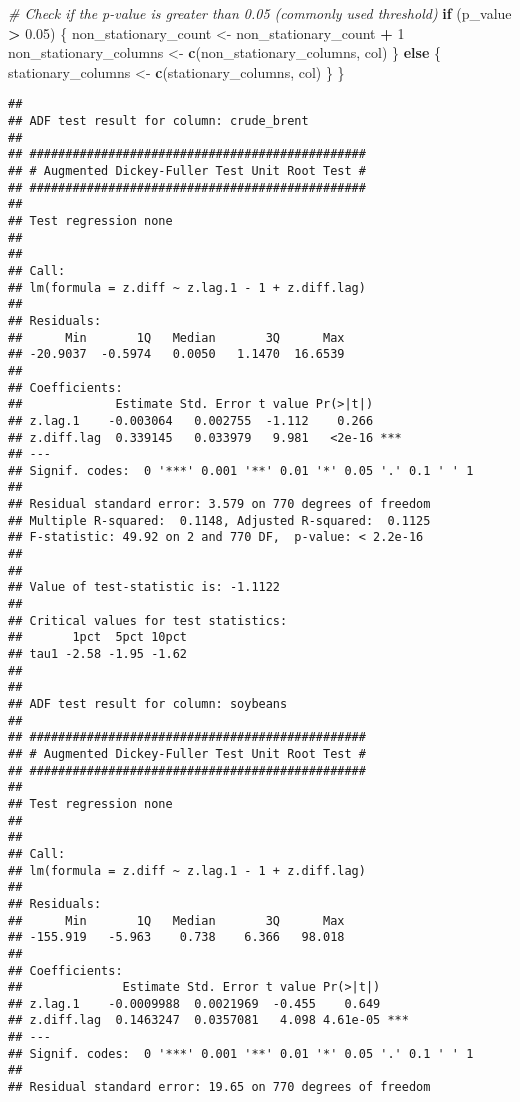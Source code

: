 \documentclass[
]{article}
\newenvironment{Shaded}{\begin{snugshade}}{\end{snugshade}}
\newcommand{\CommentTok}[1]{\textcolor[rgb]{0.56,0.35,0.01}{\textit{#1}}}
\newcommand{\ControlFlowTok}[1]{\textcolor[rgb]{0.13,0.29,0.53}{\textbf{#1}}}
\newcommand{\DecValTok}[1]{\textcolor[rgb]{0.00,0.00,0.81}{#1}}
\newcommand{\FloatTok}[1]{\textcolor[rgb]{0.00,0.00,0.81}{#1}}
\newcommand{\FunctionTok}[1]{\textcolor[rgb]{0.13,0.29,0.53}{\textbf{#1}}}
\newcommand{\NormalTok}[1]{#1}
\newcommand{\OtherTok}[1]{\textcolor[rgb]{0.56,0.35,0.01}{#1}}
\newcommand{\SpecialCharTok}[1]{\textcolor[rgb]{0.81,0.36,0.00}{\textbf{#1}}}
\begin{document}
\begin{Shaded}
\begin{Highlighting}[]
  \CommentTok{\# Check if the p{-}value is greater than 0.05 (commonly used threshold)}
  \ControlFlowTok{if}\NormalTok{ (p\_value }\SpecialCharTok{\textgreater{}} \FloatTok{0.05}\NormalTok{) \{}
\NormalTok{    non\_stationary\_count }\OtherTok{\textless{}{-}}\NormalTok{ non\_stationary\_count }\SpecialCharTok{+} \DecValTok{1}
\NormalTok{    non\_stationary\_columns }\OtherTok{\textless{}{-}} \FunctionTok{c}\NormalTok{(non\_stationary\_columns, col)}
\NormalTok{  \} }\ControlFlowTok{else}\NormalTok{ \{}
\NormalTok{    stationary\_columns }\OtherTok{\textless{}{-}} \FunctionTok{c}\NormalTok{(stationary\_columns, col)}
\NormalTok{  \}}
\NormalTok{\}}
\end{Highlighting}
\end{Shaded}

\begin{verbatim}
## 
## ADF test result for column: crude_brent 
## 
## ############################################### 
## # Augmented Dickey-Fuller Test Unit Root Test # 
## ############################################### 
## 
## Test regression none 
## 
## 
## Call:
## lm(formula = z.diff ~ z.lag.1 - 1 + z.diff.lag)
## 
## Residuals:
##      Min       1Q   Median       3Q      Max 
## -20.9037  -0.5974   0.0050   1.1470  16.6539 
## 
## Coefficients:
##             Estimate Std. Error t value Pr(>|t|)    
## z.lag.1    -0.003064   0.002755  -1.112    0.266    
## z.diff.lag  0.339145   0.033979   9.981   <2e-16 ***
## ---
## Signif. codes:  0 '***' 0.001 '**' 0.01 '*' 0.05 '.' 0.1 ' ' 1
## 
## Residual standard error: 3.579 on 770 degrees of freedom
## Multiple R-squared:  0.1148, Adjusted R-squared:  0.1125 
## F-statistic: 49.92 on 2 and 770 DF,  p-value: < 2.2e-16
## 
## 
## Value of test-statistic is: -1.1122 
## 
## Critical values for test statistics: 
##       1pct  5pct 10pct
## tau1 -2.58 -1.95 -1.62
## 
## 
## ADF test result for column: soybeans 
## 
## ############################################### 
## # Augmented Dickey-Fuller Test Unit Root Test # 
## ############################################### 
## 
## Test regression none 
## 
## 
## Call:
## lm(formula = z.diff ~ z.lag.1 - 1 + z.diff.lag)
## 
## Residuals:
##      Min       1Q   Median       3Q      Max 
## -155.919   -5.963    0.738    6.366   98.018 
## 
## Coefficients:
##              Estimate Std. Error t value Pr(>|t|)    
## z.lag.1    -0.0009988  0.0021969  -0.455    0.649    
## z.diff.lag  0.1463247  0.0357081   4.098 4.61e-05 ***
## ---
## Signif. codes:  0 '***' 0.001 '**' 0.01 '*' 0.05 '.' 0.1 ' ' 1
## 
## Residual standard error: 19.65 on 770 degrees of freedom

\end{verbatim}
\end{document}
